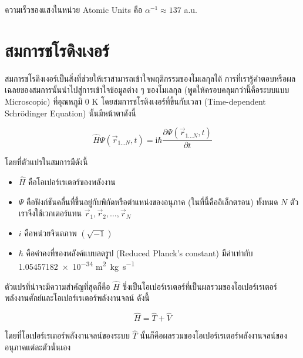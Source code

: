 \noindent ความเร็วของแสงในหน่วย Atomic Units คือ $\alpha^{-1}\approx 137$ a.u.

\section{สมการชโรดิงเงอร์}

สมการชโรดิงเงอร์เป็นสิ่งที่ช่วยให้เราสามารถเข้าใจพฤติกรรมของโมเลกุลได้ การที่เรารู้คำตอบหรือผลเฉลยของสมการนั้นนำไปสู่การเข้าใจข้อมูลต่าง ๆ
ของโมเลกุล (พูดให้ครอบคลุมกว่านี้คือระบบแบบ Microscopic) ที่อุณหภูมิ 0 K โดยสมการชโรดิงเงอร์ที่ขึ้นกับเวลา (Time-dependent
Schr\"{o}dinger Equation) นั้นมีหน้าตาดังนี้

\begin{equation}
  \label{eq:time_dependent_schrodinger}
  \hat{H} \Psi\left(\vec{r}_{1 \ldots N}, t\right)
  =
  \mathrm{i} \hbar
  \frac
  {
    \partial \Psi\left(\vec{r}_{1 \ldots N}, t\right)
  }
  {
    \partial t
  }
\end{equation}

\noindent โดยที่ตัวแปรในสมการมีดังนี้
\begin{itemize}[topsep=0pt,noitemsep]
  \setlength\itemsep{1em}
  \item $\hat{H}$ คือโอเปอร์เรเตอร์ของพลังงาน

  \item $\Psi$ คือฟังก์ชันคลื่นที่ขึ้นอยู่กับพิกัดหรือตำแหน่งของอนุภาค (ในที่นี้คืออิเล็กตรอน) ทั้งหมด $N$ ตัว เราจึงใช้เวกเตอร์แทน
        $\vec{r}_{1}, \vec{r}_{2}, \dots, \vec{r}_{N}$

  \item $i$ คือหน่วยจินตภาพ $(\sqrt{-1})$

  \item $\hbar$ คือค่าคงที่ของพลังค์แบบลดรูป (Reduced Planck's constant) มีค่าเท่ากับ
        \num{1.05457182e-34} \si{m^{2}.kg.s^{-1}}
\end{itemize}

ตัวแปรที่น่าจะมีความสำคัญที่สุดก็คือ $\hat{H}$ ซึ่งเป็นโอเปอร์เรเตอร์ที่เป็นผลรวมของโอเปอร์เรเตอร์พลังงานศักย์และโอเปอร์เรเตอร์พลังงานจลน์
ดังนี้

\begin{equation}
  \label{eq:hamiltonian_operator}
  \hat{H} = \hat{T}+\hat{V}
\end{equation}

\noindent โดยที่โอเปอร์เรเตอร์พลังงานจลน์ของระบบ $\hat{T}$ นั้นก็คือผลรวมของโอเปอร์เรเตอร์พลังงานจลน์ของอนุภาคแต่ละตัวนั่นเอง

